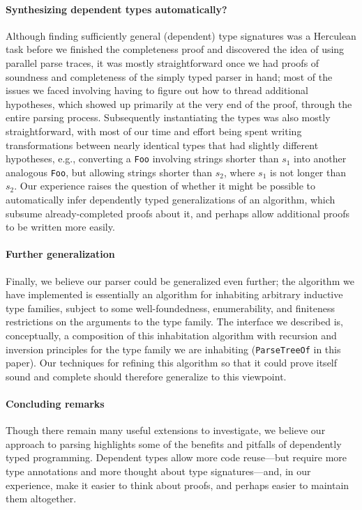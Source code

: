 \documentclass[preprint]{sigplanconf}
\newcommand{\indname}[1]{\texttt{#1}}
\begin{document}
  \paragraph{Synthesizing dependent types automatically?}
    Although finding sufficiently general (dependent) type signatures was a Herculean task before we finished the completeness proof and discovered the idea of using parallel parse traces, it was mostly straightforward once we had proofs of soundness and completeness of the simply typed parser in hand; most of the issues we faced involving having to figure out how to thread additional hypotheses, which showed up primarily at the very end of the proof, through the entire parsing process.  Subsequently instantiating the types was also mostly straightforward, with most of our time and effort being spent writing transformations between nearly identical types that had slightly different hypotheses, e.g., converting a \indname{Foo} involving strings shorter than $s_1$ into another analogous \indname{Foo}, but allowing strings shorter than $s_2$, where $s_1$ is not longer than $s_2$.  Our experience raises the question of whether it might be possible to automatically infer dependently typed generalizations of an algorithm, which subsume already-completed proofs about it, and perhaps allow additional proofs to be written more easily.

  \paragraph{Further generalization}
    Finally, we believe our parser could be generalized even further; the algorithm we have implemented is essentially an algorithm for inhabiting arbitrary inductive type families, subject to some well-foundedness, enumerability, and finiteness restrictions on the arguments to the type family.  The interface we described is, conceptually, a composition of this inhabitation algorithm with recursion and inversion principles for the type family we are inhabiting (\indname{ParseTreeOf} in this paper).  Our techniques for refining this algorithm so that it could prove itself sound and complete should therefore generalize to this viewpoint.

  \paragraph{Concluding remarks}
    Though there remain many useful extensions to investigate, we believe our approach to parsing highlights some of the benefits and pitfalls of dependently typed programming.  Dependent types allow more code reuse---but require more type annotations and more thought about type signatures---and, in our experience, make it easier to think about proofs, and perhaps easier to maintain them altogether.






\end{document}

